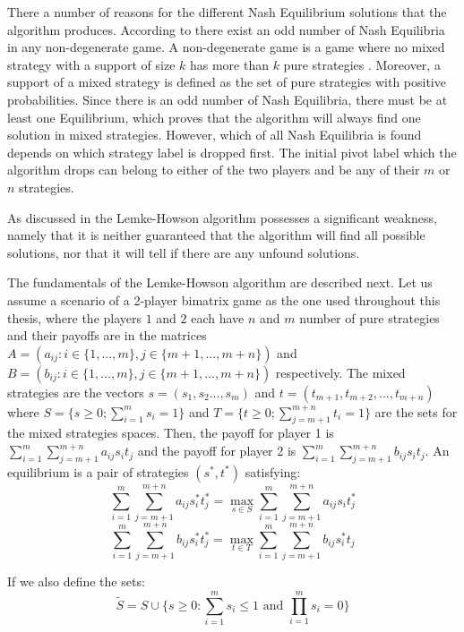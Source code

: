 {There a number of reasons for the different Nash Equilibrium solutions that the algorithm produces. According to \citet{lemke1964equilibrium} there exist an odd number of Nash Equilibria in any non-degenerate game. A non-degenerate game is a game where no mixed strategy with a support of size $k$ has more than $k$ pure strategies \citep{nisan2007algorithmic}. Moreover, a support of a mixed strategy is defined as the set of pure strategies with positive probabilities. Since there is an odd number of Nash Equilibria, there must be at least one Equilibrium, which proves that the algorithm will always find one solution in mixed strategies. However, which of all Nash Equilibria is found depends on which strategy label is dropped first. The initial pivot label which the algorithm drops can belong to either of the two players and be any of their $m$ or $n$ strategies.

As discussed in \citet{shapley1974note} the Lemke-Howson algorithm possesses a significant weakness, namely that it is neither guaranteed that the algorithm will find all possible solutions, nor that it will tell if there are any unfound solutions.

The fundamentals of the Lemke-Howson algorithm are described next. Let us assume a scenario of a 2-player bimatrix game as the one used throughout this thesis, where the players $1$ and $2$ each have $n$ and $m$ number of pure strategies and their payoffs are in the matrices $A = (a_{ij}: i \in \{1,...,m\}, j \in \{ m+1,...,m+n\})$ and $B = (b_{ij}: i \in \{1,...,m\}, j \in \{m+1,...,m+n\})$ respectively. The mixed strategies are the vectors $s=(s_1,s_2...,s_m)$ and $t=(t_{m+1},t_{m+2},...,t_{m+n})$ where $S = \{s \geq 0; \sum_{i=1}^{m}s_i = 1\}$ and $T = \{t \geq 0; \sum_{j=m+1}^{m+n}t_i = 1\}$ are the sets for the mixed strategies spaces. Then, the payoff for player 1 is $\sum_{i=1}^{m}\sum_{j=m+1}^{m+n} a_{ij} s_i t_j$ and the payoff for player 2 is $\sum_{i=1}^{m} \sum_{j=m+1}^{m+n} b_{ij} s_i t_j$. An equilibrium is a pair of strategies $(s^*,t^*)$ satisfying:
\begin{equation}
\sum_{i=1}^{m} \sum_{j=m+1}^{m+n} a_{ij}s_i^*t_j^* = \max_{s \in S} \sum_{i=1}^{m} \sum_{j=m+1}^{m+n} a_{ij}s_i t_j^*
\end{equation}
\begin{equation}
\sum_{i=1}^{m} \sum_{j=m+1}^{m+n} b_{ij}s_i^*t_j^* = \max_{t \in T} \sum_{i=1}^{m} \sum_{j=m+1}^{m+n} b_{ij}s_i^* t_j
\end{equation}


If we also define the sets:
\begin{equation}
\tilde{S} =  S \cup \{ s \geq 0: \sum_{i=1}^{m} s_i \leq 1 \text{ and } \prod_{i=1}^{m} s_i = 0 \}
\end{equation}

}
